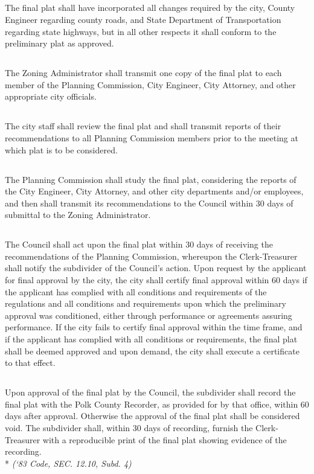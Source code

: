 \subsection{}
The final plat shall have incorporated all changes required by the city, County Engineer regarding county roads, and State Department of Transportation regarding state highways, but in all other respects it shall conform to the preliminary plat as approved.
\subsection{}
The Zoning Administrator shall transmit one copy of the final plat to each member of the Planning Commission, City Engineer, City Attorney, and other appropriate city officials.
\subsection{}
The city staff shall review the final plat and shall transmit reports of their recommendations to all Planning Commission members prior to the meeting at which plat is to be considered.
\subsection{}
The Planning Commission shall study the final plat, considering the reports of the City Engineer, City Attorney, and other city departments and/or employees, and then shall transmit its recommendations to the Council within 30 days of submittal to the Zoning Administrator.
\subsection{}
The Council shall act upon the final plat within 30 days of receiving the recommendations of the Planning Commission, whereupon the Clerk-Treasurer shall notify the subdivider of the Council’s action. Upon request by the applicant for final approval by the city, the city shall certify final approval within 60 days if the applicant has complied with all conditions and requirements of the regulations and all conditions and requirements upon which the preliminary approval was conditioned, either through performance or agreements assuring performance. If the city fails to certify final approval within the time frame, and if the applicant has complied with all conditions or requirements, the final plat shall be deemed approved and upon demand, the city shall execute a certificate to that effect.
\subsection{}
Upon approval of the final plat by the Council, the subdivider shall record the final plat with the Polk County Recorder, as provided for by that office, within 60 days after approval.  Otherwise the approval of the final plat shall be considered void. The subdivider shall, within 30 days of recording, furnish the Clerk-Treasurer with a reproducible print of the final plat showing evidence of the recording.\\*
\emph{(‘83 Code, SEC. 12.10, Subd. 4)}
